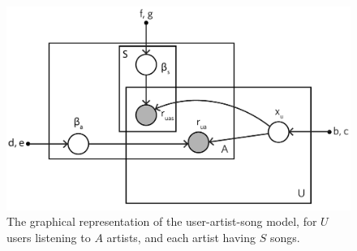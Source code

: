\begin{figure}[htb]
  \begin{center}
    \includegraphics[height=0.5\textwidth]{../fig/user-artist-song-model}
  \end{center}
  \caption{The graphical representation of the user-artist-song model, for $U$ users listening to $A$ artists, and each artist having $S$ songs.}
  \label{fig:uasmodel}
\end{figure}